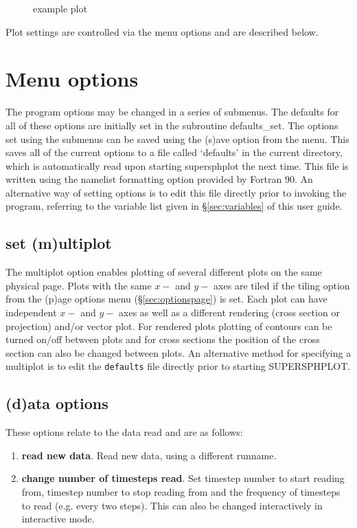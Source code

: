 \documentclass[a4paper,12pt]{article}
\begin{document}
\begin{figure}
\centering
\caption{example plot}
\end{figure}
 Plot settings are controlled via the menu options and are described below. 


\section{Menu options}
 The program options may be changed in a series of submenus. The defaults for all of
these options are initially set in the subroutine defaults\_set. The options set using
the submenus can be saved using the (s)ave option from the menu. This saves all of
the current options to a file called `defaults' in the current directory, which is
automatically read upon starting supersphplot the next time. This file is written using
the namelist formatting option provided by Fortran 90. An alternative way of setting
options is to edit this file directly prior to invoking the program, referring to the
variable list given in \S\ref{sec:variables} of this user guide. 

\subsection{set (m)ultiplot}
 The multiplot option enables plotting of several different plots on the same
physical page. Plots with the same $x-$ and $y-$ axes are tiled if the tiling
option from the (p)age options menu (\S\vref{sec:optionspage}) is set. Each plot
can have independent $x-$ and $y-$ axes as well as a different rendering (cross
section or projection) and/or vector plot. For rendered plots plotting of
contours can be turned on/off between plots and for cross sections the position of
the cross section can also be changed between plots. An alternative method for
specifying a multiplot is to edit the \verb+defaults+ file directly prior to
starting SUPERSPHPLOT.

\subsection{(d)ata options}
These options relate to the data read and are as follows:
\begin{enumerate}
\item \textbf{read new data}. Read new data, using a different runname.
\item \textbf{change number of timesteps read}. Set timestep number to start
reading from, timestep number to stop reading from and the frequency of
timesteps to read (e.g. every two steps). This can also be changed interactively in
interactive mode.
\end{enumerate}
\end{document}
